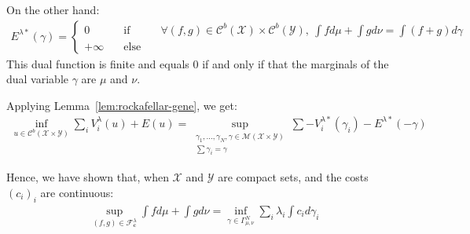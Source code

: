 \begin{prv*}
On  the other hand:
\begin{align*}
E^{\lambda*}(\gamma)=\left\{\begin{matrix} 0 &\quad\text{if}\quad& \forall (f,g)\in \mathcal{C}^b(\mathcal{X})\times \mathcal{C}^b(\mathcal{Y}),~ \int fd\mu+\int gd\nu  = \int (f+g)d\gamma\\
+\infty &\quad\text{else}\quad&\end{matrix}\right.
\end{align*}
This dual function is finite and equals $0$ if and only if that the marginals of the dual variable $\gamma$ are $\mu$ and $\nu$. 

Applying Lemma~\ref{lem:rockafellar-gene}, we get:
\begin{align*}
\inf_{u\in \mathcal{C}^b(\mathcal{X}\times\mathcal{Y})} \sum_i V^{\lambda}_i(u)+E(u) = \sup\limits_{\substack{\gamma_1,...,\gamma_N,\gamma\in \mathcal{M}(\mathcal{X}\times\mathcal{Y})\\\sum\gamma_i=\gamma}}\sum -V^{\lambda*}_i(\gamma_i)-E^{\lambda*}(-\gamma)
\end{align*}



Hence, we  have shown that, when $\mathcal{X}$ and $\mathcal{Y}$ are compact sets, and  the costs $(c_i)_i$ are continuous:
\begin{align*}
\sup\limits_{(f,g)\in\mathcal{F}^\lambda_\mathbf{c}}\int fd\mu+\int gd\nu = \inf\limits_{\gamma\in\Gamma^N_{\mu,\nu}}\sum_i\lambda_i \int c_id\gamma_i
\end{align*}




\end{prv*}
